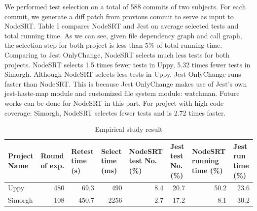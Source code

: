 \documentclass[10pt, conference]{IEEEtran}
\begin{document}
We performed test selection on a total of 588 commits of two subjects. For each commit, we generate a diff patch from provious commit to serve as input to NodeSRT. 
Table I compares NodeSRT and Jest on average selected tests and total running time. As we can see, given file dependency graph and call graph, the selection step 
for both project is less than 5\% of total running time. Comparing to Jest OnlyChange, NodeSRT
selects much less tests for both projects. NodeSRT selects 1.5 times fewer 
tests in Uppy, 5.32 times fewer tests in Simorgh. Although NodeSRT selects less tests in Uppy, Jest OnlyChange runs faster than NodeSRT. 
This is because Jest OnlyChange makes use of Jest's own jest-haste-map module and customized file system module: watchman. Future works can 
be done for NodeSRT in this part. For project with high code coverage: Simorgh, NodeSRT selectes fewer tests and is 2.72 times faster. 
\begin{table}[htbp]
    \caption{Empirical study result}
    \centering
    \begin{tabular}{@{}p{2em}p{2.2em}p{2em}p{1.8em}p{3.5em}p{2em}p{3.5em}p{3em}@{}}
    \toprule
    \textbf{Project Name} & \textbf{Round of exp.}  & \textbf{Retest time (s)} & \textbf{Select time (ms)} & \textbf{NodeSRT test No. (\%)}    & \textbf{Jest test No. (\%)}       & \textbf{NodeSRT running time (\%)} & \textbf{Jest run time (\%)} \\ \midrule
    Uppy         & \multicolumn{1}{r}{480} & \multicolumn{1}{r}{69.3}  & \multicolumn{1}{r}{490} & \multicolumn{1}{r}{8.4} & \multicolumn{1}{r}{20.7} & \multicolumn{1}{r}{50.2}  &   \multicolumn{1}{r}{23.6} \\ 
    Simorgh      & \multicolumn{1}{r}{108} & \multicolumn{1}{r}{450.7} & \multicolumn{1}{r}{2256} & \multicolumn{1}{r}{2.7}& \multicolumn{1}{r}{17.2} & \multicolumn{1}{r}{8.1}   &  \multicolumn{1}{r}{30.2} \\ \bottomrule
    \end{tabular}
    \end{table}
\end{document}
